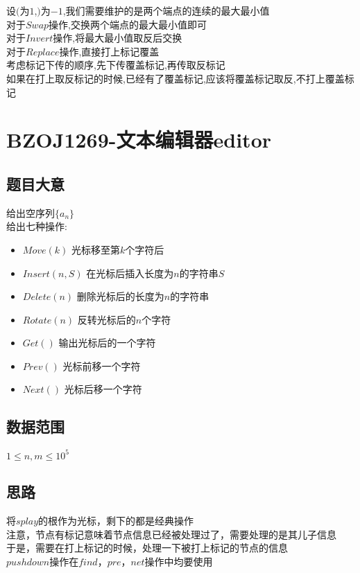 \documentclass{ctexart}
\numberwithin{equation}{section}
\begin{document}
\begin{flushleft}
  设$($为$1$,$)$为$-1$,我们需要维护的是两个端点的连续的最大最小值\\

  对于$Swap$操作,交换两个端点的最大最小值即可\\
  对于$Invert$操作,将最大最小值取反后交换\\
  对于$Replace$操作,直接打上标记覆盖\\

  考虑标记下传的顺序,先下传覆盖标记,再传取反标记\\
  如果在打上取反标记的时候,已经有了覆盖标记,应该将覆盖标记取反,不打上覆盖标记\\
  \newpage

  \section{BZOJ1269-文本编辑器editor}
  \subsection{题目大意}
  给出空序列$\{a_n\}$\\
  给出七种操作:\\
  \begin{itemize}
  \item $Move(k)$ 光标移至第$k$个字符后
  \item $Insert(n,S)$ 在光标后插入长度为$n$的字符串$S$
  \item $Delete(n)$ 删除光标后的长度为$n$的字符串
  \item $Rotate(n)$ 反转光标后的$n$个字符
  \item $Get()$ 输出光标后的一个字符
  \item $Prev()$ 光标前移一个字符
  \item $Next()$ 光标后移一个字符
  \end{itemize}
  \subsection{数据范围}
  $1\le n,m \le 10^5$
  \subsection{思路}
  将$splay$的根作为光标，剩下的都是经典操作\\

  注意，节点有标记意味着节点信息已经被处理过了，需要处理的是其儿子信息\\
  于是，需要在打上标记的时候，处理一下被打上标记的节点的信息\\
  $pushdown$操作在$find，pre，net$操作中均要使用\\
  \newpage


\end{flushleft}
\end{document}

